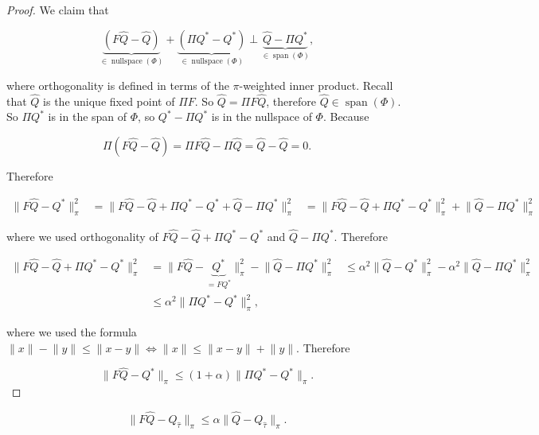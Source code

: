 \begin{proof}

We claim that

\[
\underbrace{(F \hat{Q} - \hat{Q})}_{\in \operatorname{nullspace}(\Phi)} + \underbrace{(\Pi Q^* - Q^*)}_{\in \operatorname{nullspace}(\Phi)} \perp \underbrace{\hat{Q} - \Pi Q^*}_{\in \operatorname{span}(\Phi)},
\]

where orthogonality is defined in terms of the \(\pi\)-weighted inner product. Recall that \(\hat{Q}\) is the unique fixed point of \(\Pi F\). So \(\hat{Q} = \Pi F \hat{Q}\), therefore \(\hat{Q} \in \operatorname{span}(\Phi)\). So \(\Pi Q^*\) is in the span of \(\Phi\), so \(Q^* - \Pi Q^*\) is in the nullspace of \(\Phi\). Because

\[
\Pi(F \hat{Q} - \hat{Q}) = \Pi F\hat{Q} - \Pi \hat{Q} = \hat{Q} - \hat{Q} = 0.
\]

Therefore 

\begin{align*}
\lVert F \hat{Q} - Q^* \rVert_\pi^2 & = \lVert F \hat{Q} - \hat{Q} + \Pi Q^* - Q^* + \hat{Q} - \Pi Q^* \rVert_\pi^2
& = \lVert F \hat{Q} - \hat{Q} + \Pi Q^* - Q^*\rVert_\pi^2  +  \lVert \hat{Q} - \Pi Q^* \rVert_\pi^2
\end{align*} 

where we used orthogonality of \( F \hat{Q} - \hat{Q} + \Pi Q^* - Q^*\) and \(\hat{Q} - \Pi Q^* \).  Therefore

\begin{align*}
\lVert F \hat{Q} - \hat{Q} + \Pi Q^*-  Q^* \rVert_\pi^2 & = \lVert F \hat{Q} - \underbrace{Q^*}_{= F Q^*} \rVert_\pi^2 - \lVert \hat{Q} - \Pi Q^* \rVert_\pi^2
& \leq \alpha^2 \lVert \hat{Q} - Q^* \rVert_\pi^2 - \alpha^2 \lVert \hat{Q} - \Pi Q^* \rVert_\pi^2
\\ & \leq \alpha^2 \lVert \Pi Q^* - Q^* \rVert_\pi^2,
\end{align*} 

where we used the formula \(\lVert x \rVert - \lVert y \rVert \leq \lVert x - y \rVert \iff \lVert x \rVert \leq \lVert x - y \rVert + \lVert y\rVert\). Therefore

\[
\lVert F \hat{Q} - Q^* \rVert_\pi \leq (1 + \alpha) \lVert \Pi Q^* - Q^* \rVert_\pi.
\]

\end{proof}

\begin{lemma}

\[
\lVert F \hat{Q} - Q_{\hat{\tau}} \rVert_\pi \leq \alpha \lVert \hat{Q} - Q_{\hat{\tau}} \rVert_\pi.
\]

\end{lemma}

